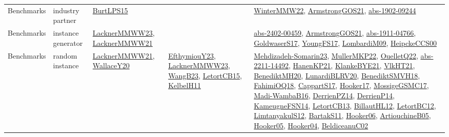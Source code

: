{\begin{longtable}{lp{3cm}>{\raggedright}p{6cm}>{\raggedright}p{6cm}p{8cm}}
Benchmarks & industry partner & \href{papers/BurtLPS15.pdf}{BurtLPS15}\cite{BurtLPS15} &  & \href{papers/WinterMMW22.pdf}{WinterMMW22}\cite{WinterMMW22}, \href{papers/ArmstrongGOS21.pdf}{ArmstrongGOS21}\cite{ArmstrongGOS21}, \href{articles/abs-1902-09244.pdf}{abs-1902-09244}\cite{abs-1902-09244}\\
Benchmarks & instance generator & \href{articles/LacknerMMWW23.pdf}{LacknerMMWW23}\cite{LacknerMMWW23}, \href{papers/LacknerMMWW21.pdf}{LacknerMMWW21}\cite{LacknerMMWW21} &  & \href{articles/abs-2402-00459.pdf}{abs-2402-00459}\cite{abs-2402-00459}, \href{papers/ArmstrongGOS21.pdf}{ArmstrongGOS21}\cite{ArmstrongGOS21}, \href{articles/abs-1911-04766.pdf}{abs-1911-04766}\cite{abs-1911-04766}, \href{papers/GoldwaserS17.pdf}{GoldwaserS17}\cite{GoldwaserS17}, \href{papers/YoungFS17.pdf}{YoungFS17}\cite{YoungFS17}, \href{papers/LombardiM09.pdf}{LombardiM09}\cite{LombardiM09}, \href{articles/HeipckeCCS00.pdf}{HeipckeCCS00}\cite{HeipckeCCS00}\\
Benchmarks & random instance & \href{papers/LacknerMMWW21.pdf}{LacknerMMWW21}\cite{LacknerMMWW21}, \href{articles/WallaceY20.pdf}{WallaceY20}\cite{WallaceY20} & \href{papers/EfthymiouY23.pdf}{EfthymiouY23}\cite{EfthymiouY23}, \href{articles/LacknerMMWW23.pdf}{LacknerMMWW23}\cite{LacknerMMWW23}, \href{papers/WangB23.pdf}{WangB23}\cite{WangB23}, \href{articles/LetortCB15.pdf}{LetortCB15}\cite{LetortCB15}, \href{articles/KelbelH11.pdf}{KelbelH11}\cite{KelbelH11} & \href{papers/Mehdizadeh-Somarin23.pdf}{Mehdizadeh-Somarin23}\cite{Mehdizadeh-Somarin23}, \href{articles/MullerMKP22.pdf}{MullerMKP22}\cite{MullerMKP22}, \href{papers/OuelletQ22.pdf}{OuelletQ22}\cite{OuelletQ22}, \href{articles/abs-2211-14492.pdf}{abs-2211-14492}\cite{abs-2211-14492}, \href{papers/HanenKP21.pdf}{HanenKP21}\cite{HanenKP21}, \href{papers/KlankeBYE21.pdf}{KlankeBYE21}\cite{KlankeBYE21}, \href{articles/VlkHT21.pdf}{VlkHT21}\cite{VlkHT21}, \href{articles/BenediktMH20.pdf}{BenediktMH20}\cite{BenediktMH20}, \href{articles/LunardiBLRV20.pdf}{LunardiBLRV20}\cite{LunardiBLRV20}, \href{papers/BenediktSMVH18.pdf}{BenediktSMVH18}\cite{BenediktSMVH18}, \href{articles/FahimiOQ18.pdf}{FahimiOQ18}\cite{FahimiOQ18}, \href{papers/CappartS17.pdf}{CappartS17}\cite{CappartS17}, \href{papers/Hooker17.pdf}{Hooker17}\cite{Hooker17}, \href{papers/MossigeGSMC17.pdf}{MossigeGSMC17}\cite{MossigeGSMC17}, \href{papers/Madi-WambaB16.pdf}{Madi-WambaB16}\cite{Madi-WambaB16}, \href{papers/DerrienPZ14.pdf}{DerrienPZ14}\cite{DerrienPZ14}, \href{papers/DerrienP14.pdf}{DerrienP14}\cite{DerrienP14}, \href{articles/KameugneFSN14.pdf}{KameugneFSN14}\cite{KameugneFSN14}, \href{papers/LetortCB13.pdf}{LetortCB13}\cite{LetortCB13}, \href{papers/BillautHL12.pdf}{BillautHL12}\cite{BillautHL12}, \href{papers/LetortBC12.pdf}{LetortBC12}\cite{LetortBC12}, \href{articles/LimtanyakulS12.pdf}{LimtanyakulS12}\cite{LimtanyakulS12}, \href{articles/BartakS11.pdf}{BartakS11}\cite{BartakS11}, \href{articles/Hooker06.pdf}{Hooker06}\cite{Hooker06}, \href{papers/ArtiouchineB05.pdf}{ArtiouchineB05}\cite{ArtiouchineB05}, \href{articles/Hooker05.pdf}{Hooker05}\cite{Hooker05}, \href{papers/Hooker04.pdf}{Hooker04}\cite{Hooker04}, \href{papers/BeldiceanuC02.pdf}{BeldiceanuC02}\cite{BeldiceanuC02}\\

\end{longtable}}
